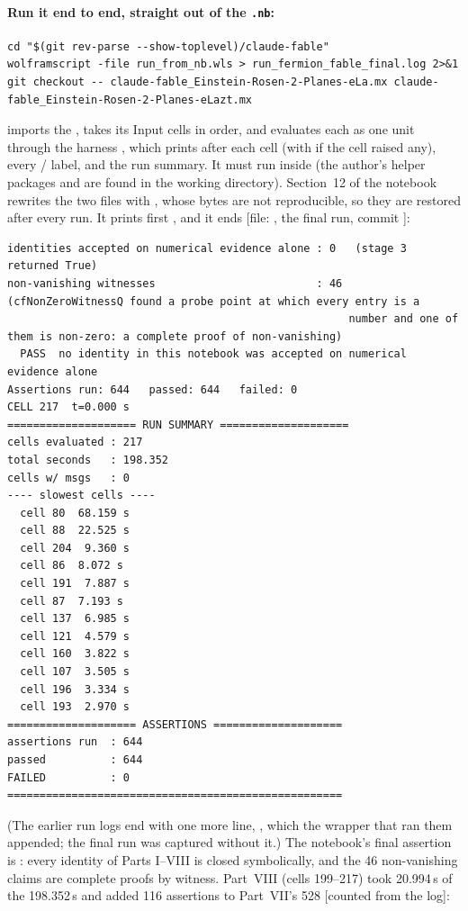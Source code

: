 \paragraph{Run it end to end, straight out of the \texttt{.nb}:}
\begin{Verbatim}[fontsize=\scriptsize]
cd "$(git rev-parse --show-toplevel)/claude-fable"
wolframscript -file run_from_nb.wls > run_fermion_fable_final.log 2>&1
git checkout -- claude-fable_Einstein-Rosen-2-Planes-eLa.mx claude-fable_Einstein-Rosen-2-Planes-eLazt.mx
\end{Verbatim}
 imports the , takes its Input cells in order, and evaluates each as one unit
through the harness , which prints  after each cell (with
 if the cell raised any), every / label, and the run summary. It
must run inside  (the author's helper packages  and
 are found in the working directory). Section~12 of the notebook rewrites the two 
files with , whose bytes are not reproducible, so they are restored after every run. It prints
first , and it ends [file:
, the final run, commit ]:
\begin{Verbatim}[fontsize=\scriptsize]
identities accepted on numerical evidence alone : 0   (stage 3 returned True)
non-vanishing witnesses                         : 46   (cfNonZeroWitnessQ found a probe point at which every entry is a
                                                     number and one of them is non-zero: a complete proof of non-vanishing)
  PASS  no identity in this notebook was accepted on numerical evidence alone
Assertions run: 644   passed: 644   failed: 0
CELL 217  t=0.000 s
==================== RUN SUMMARY ====================
cells evaluated : 217
total seconds   : 198.352
cells w/ msgs   : 0
---- slowest cells ----
  cell 80  68.159 s
  cell 88  22.525 s
  cell 204  9.360 s
  cell 86  8.072 s
  cell 191  7.887 s
  cell 87  7.193 s
  cell 137  6.985 s
  cell 121  4.579 s
  cell 160  3.822 s
  cell 107  3.505 s
  cell 196  3.334 s
  cell 193  2.970 s
==================== ASSERTIONS ====================
assertions run  : 644
passed          : 644
FAILED          : 0
====================================================
\end{Verbatim}
(The earlier run logs end with one more line, , which the wrapper that ran them appended;
the final run was captured without it.) The notebook's final assertion is
: every identity of Parts I--VIII is closed symbolically, and the 46
non-vanishing claims are complete proofs by witness. Part~VIII (cells 199--217) took 20.994\,s of the
198.352\,s and added 116 assertions to Part~VII's 528 [counted from the log]:


